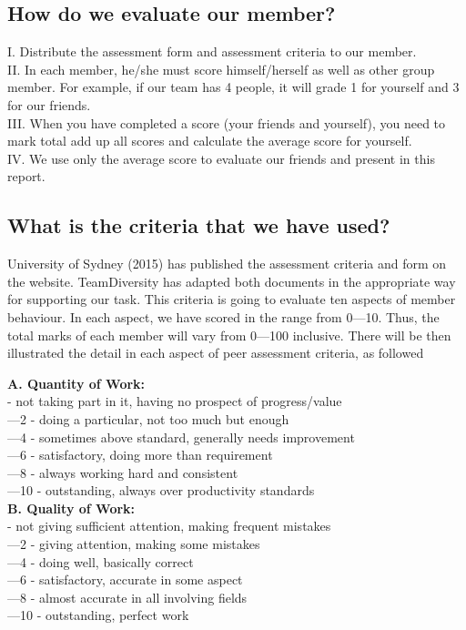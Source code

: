\documentclass[11pt]{article}
\begin{document}
	\subsection{How do we evaluate our member?}
	
	\indent\indent I. Distribute the assessment form and assessment criteria to our member.\\
	\indent II. In each member, he/she must score himself/herself as well as other group member. For example, if our team has 4 people, it will grade 1 for yourself and 3 for our friends.\\
	\indent III. When you have completed a score (your friends and yourself), you need to mark total add up all scores and calculate the average score for yourself. \\
	\indent IV. We use only the average score to evaluate our friends and present in this report. 


	\subsection{What is the criteria that we have used?}
	\indent\indent\indent University of Sydney (2015) has published the assessment criteria and form on the website. TeamDiversity has adapted both documents in the appropriate way for supporting our task. This criteria is going to evaluate ten aspects of member behaviour. In each aspect, we have scored in the range from 0—10. Thus, the total marks of each member will vary from 0—100 inclusive. There will be then illustrated the detail in each aspect of peer assessment criteria, as followed \newline 

\textbf{A. Quantity of Work:}\\
	\indent{}	- not taking part in it, having no prospect of progress/value \\
	\indent{}—2	- doing a particular, not too much but enough\\
	\indent{}—4	- sometimes above standard, generally needs improvement \\
	\indent{}—6	- satisfactory, doing more than requirement \\
	\indent{}—8	- always working hard and consistent \\
	\indent{}—10	- outstanding, always over productivity standards \\

\textbf{B. Quality of Work:}\\
	\indent{}	- not giving sufficient attention, making frequent mistakes\\
	\indent{}—2	- giving attention, making some mistakes\\
	\indent{}—4	- doing well, basically correct\\
	\indent{}—6	- satisfactory, accurate in some aspect\\
	\indent{}—8	- almost accurate in all involving fields\\
	\indent{}—10	- outstanding, perfect work\\
\end{document}
